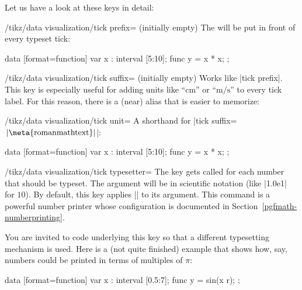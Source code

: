 Let us have a look at these keys in detail:

\begin{key}{/tikz/data visualization/tick prefix= (initially \normalfont empty)}
    The  will be put in front of every typeset tick:
\begin{codeexample}[preamble={\usetikzlibrary{datavisualization.formats.functions}}]
\tikz \datavisualization
  [scientific axes, all axes={ticks=few, length=2.5cm},
   x axis={ticks={tick prefix=$\langle$, tick suffix=$]$}},
   visualize as line]
  data [format=function] {
    var x : interval [5:10];
    func y = \value x * \value x;
  };
\end{codeexample}
\end{key}

\begin{key}{/tikz/data visualization/tick suffix= (initially \normalfont empty)}
    Works like |tick prefix|. This key is especially useful for adding units like ``cm'' or ``$\mathrm m/\mathrm s$'' to every tick label. For this reason, there is a (near) alias that is easier to memorize:
    \begin{key}{/tikz/data visualization/tick unit=}
        A shorthand for |tick suffix={$\,\rm|\meta{roman math text}|$}|:
\begin{codeexample}[preamble={\usetikzlibrary{datavisualization.formats.functions}}]
\tikz \datavisualization
  [scientific axes, all axes={length=3cm},
   x axis={ticks={tick unit=s}},
   y axis={ticks={tick unit=m/s^2}},
   visualize as line]
  data [format=function] {
    var x : interval [5:10];
    func y = \value x * \value x;
  };
\end{codeexample}
    \end{key}
\end{key}

\begin{key}{/tikz/data visualization/tick typesetter=}
    The key gets called for each number that should be typeset. The argument  will be in scientific notation (like |1.0e1| for $10$). By default, this key applies |\pgfmathprintnumber| to its argument. This command is a powerful number printer whose configuration is documented in Section~\ref{pgfmath-numberprinting}.

    You are invited to code underlying this key so that a different typesetting mechanism is used. Here is a (not quite finished) example that shows how, say, numbers could be printed in terms of multiples of $\pi$:
\begin{codeexample}[preamble={\usetikzlibrary{datavisualization.formats.functions}}]
\def\mytypesetter#1{%
  \pgfmathparse{#1/pi}%
  \pgfmathprintnumber{\pgfmathresult}$\pi$%
}
\tikz \datavisualization
  [school book axes, all axes={unit length=1.25cm},
   x axis={ticks={step=(0.5*pi), tick typesetter/.code=\mytypesetter{##1}}},
   y axis={include value={-1,1}},
   visualize as smooth line]
  data [format=function] {
    var x : interval [0.5:7];
    func y = sin(\value x r);
  };
\end{codeexample}
\end{key}


